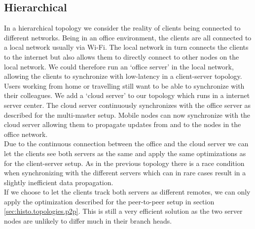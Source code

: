 \subsection{Hierarchical}
In a hierarchical topology we consider the reality of clients being connected to different networks.
Being in an office environment, the clients are all connected to a local network usually via Wi-Fi.
The local network in turn connects the clients to the internet but also allows them to directly connect to other nodes on the local network.
We could therefore run an `office server' in the local network, allowing the clients to synchronize with low-latency in a client-server topology.\\
Users working from home or travelling still want to be able to synchronize with their colleagues.
We add a `cloud server' to our topology which runs in a internet server center.
The cloud server continuously synchronizes with the office server as described for the multi-master setup.
Mobile nodes can now synchronize with the cloud server allowing them to propagate updates from and to the nodes in the office network.\\
Due to the continuous connection between the office and the cloud server we can let the clients see both servers as the same and apply the same optimizations as for the client-server setup.
As in the previous topology there is a race condition when synchronizing with the different servers which can in rare cases result in a slightly inefficient data propagation.\\
If we choose to let the clients track both servers as different remotes, we can only apply the optimization described for the peer-to-peer setup in section \ref{sec:histo.topologies.p2p}.
This is still a very efficient solution as the two server nodes are unlikely to differ much in their branch heads.

